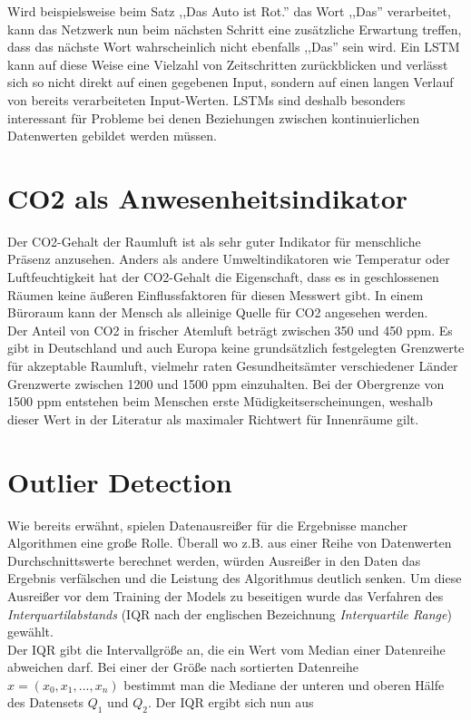 Wird beispielsweise beim Satz ,,Das Auto ist Rot.'' das Wort ,,Das'' verarbeitet, kann das Netzwerk nun beim nächsten
Schritt eine zusätzliche Erwartung treffen, dass das nächste Wort wahrscheinlich nicht ebenfalls ,,Das'' sein wird.
Ein LSTM kann auf diese Weise eine Vielzahl von Zeitschritten zurückblicken und verlässt sich so nicht direkt auf 
einen gegebenen Input, sondern auf einen langen Verlauf von bereits verarbeiteten Input-Werten. 
LSTMs sind deshalb besonders interessant für Probleme bei denen Beziehungen zwischen kontinuierlichen 
Datenwerten gebildet werden müssen.

\section{CO2 als Anwesenheitsindikator}\label{CO2}

Der CO2-Gehalt der Raumluft ist als sehr guter Indikator für menschliche Präsenz anzusehen. Anders als andere 
Umweltindikatoren wie Temperatur oder Luftfeuchtigkeit hat der CO2-Gehalt die Eigenschaft, dass es in 
geschlossenen Räumen keine äußeren Einflussfaktoren für diesen Messwert gibt. In einem Büroraum kann der 
Mensch als alleinige Quelle für CO2 angesehen werden.\\
Der Anteil von CO2 in frischer Atemluft beträgt zwischen 350 und 450 ppm. Es gibt in Deutschland und auch Europa 
keine grundsätzlich festgelegten Grenzwerte für akzeptable Raumluft, vielmehr raten Gesundheitsämter 
verschiedener Länder Grenzwerte zwischen 1200 und 1500 ppm einzuhalten. Bei der Obergrenze von 1500 ppm 
entstehen beim Menschen erste Müdigkeitserscheinungen, weshalb dieser Wert in der Literatur als maximaler 
Richtwert für Innenräume gilt. \newpage

\section{Outlier Detection}
Wie bereits erwähnt, spielen Datenausreißer für die Ergebnisse mancher Algorithmen eine große Rolle. Überall 
wo z.B. aus einer Reihe von Datenwerten Durchschnittswerte berechnet werden, würden Ausreißer in den Daten das 
Ergebnis verfälschen und die Leistung des Algorithmus deutlich senken.
Um diese Ausreißer vor dem Training der Models zu beseitigen wurde das Verfahren des 
\textit{Interquartilabstands} (IQR nach der englischen Bezeichnung \textit{Interquartile Range}) gewählt.\\
Der IQR gibt die Intervallgröße an, die ein Wert vom Median einer Datenreihe abweichen darf. Bei einer 
der Größe nach sortierten Datenreihe $x = (x_0,x_1,...,x_n)$ bestimmt man die Mediane der unteren und oberen 
Hälfe des Datensets $Q_1$ und $Q_2$. Der IQR ergibt sich nun aus 

